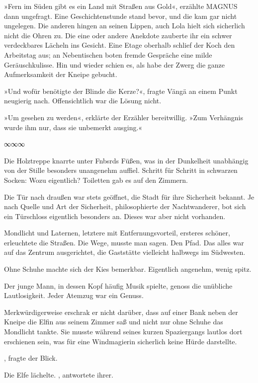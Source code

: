 »Fern im Süden gibt es ein Land mit Straßen aus Gold«, erzählte MAGNUS dann ungefragt. Eine Geschichtenstunde stand bevor, und die kam gar nicht ungelegen. Die anderen hingen an seinen Lippen, auch Lola hielt sich sicherlich nicht die Ohren zu. Die eine oder andere Anekdote zauberte ihr ein schwer verdeckbares Lächeln ins Gesicht. Eine Etage oberhalb schlief der Koch den Arbeitstag aus; an Nebentischen boten fremde Gespräche eine milde Geräuschkulisse. Hin und wieder schien es, als habe der Zwerg die ganze Aufmerksamkeit der Kneipe gebucht.

»Und wofür benötigte der Blinde die Kerze?«, fragte Vängä an einem Punkt neugierig nach. Offensichtlich war die Lösung nicht.

»Um gesehen zu werden«, erklärte der Erzähler bereitwillig. »Zum Verhängnis wurde ihm nur, dass sie unbemerkt ausging.«

\begin{center}
∞∞∞
\end{center}

Die Holztreppe knarrte unter Fnbsrds Füßen, was in der Dunkelheit unabhängig von der Stille besonders unangenehm auffiel. Schritt für Schritt in schwarzen Socken: Wozu eigentlich? Toiletten gab es auf den Zimmern.

Die Tür nach draußen war stets geöffnet, die Stadt für ihre Sicherheit bekannt. Je nach Quelle und Art der Sicherheit, philosophierte der Nachtwanderer, bot sich ein Türschloss eigentlich besonders an. Dieses war aber nicht vorhanden.

Mondlicht und Laternen, letztere mit Entfernungsvorteil, ersteres schöner, erleuchtete die Straßen. Die Wege, musste man sagen. Den Pfad. Das alles war auf das Zentrum ausgerichtet, die Gaststätte vielleicht halbwegs im Südwesten.

Ohne Schuhe machte sich der Kies bemerkbar. Eigentlich angenehm, wenig spitz.

Der junge Mann, in dessen Kopf häufig Musik spielte, genoss die unübliche Lautlosigkeit. Jeder Atemzug war ein Genuss.

Merkwürdigerweise erschrak er nicht darüber, dass auf einer Bank neben der Kneipe die Elfin aus seinem Zimmer saß und nicht nur ohne Schuhe das Mondlicht tankte. Sie musste während seines kurzen Spaziergangs lautlos dort erschienen sein, was für eine Windmagierin sicherlich keine Hürde darstellte.

, fragte der Blick.

Die Elfe lächelte. , antwortete ihrer.

